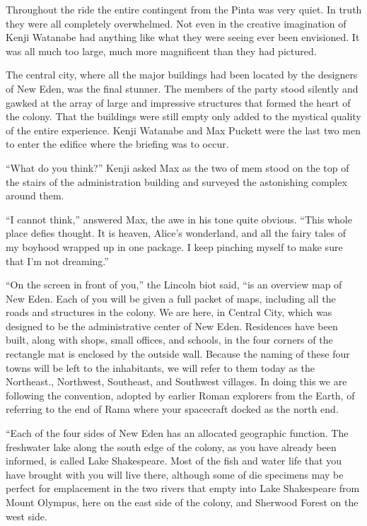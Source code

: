 \documentclass[]{article}
\begin{document}
{Throughout the ride the entire contingent from the Pinta was very quiet.  In truth they were all completely overwhelmed.  Not even in the creative imagination of Kenji Watanabe had anything like what they were seeing ever been envisioned.  It was all much too large, much more magnificent than they had pictured.

The central city, where all the major buildings had been located by the designers of New Eden, was the final stunner.  The members of the party stood silently and gawked at the array of large and impressive structures that formed the heart of the colony.  That the buildings were still empty only added to the mystical quality of the entire experience.  Kenji Watanabe and Max Puckett were the last two men to enter the edifice where the briefing was to occur.

“What do you think?” Kenji asked Max as the two of mem stood on the top of the stairs of the administration building and surveyed the astonishing complex around them.

“I cannot think,” answered Max, the awe in his tone quite obvious.  “This whole place defies thought.  It is heaven, Alice’s wonderland, and all the fairy tales of my boyhood wrapped up in one package.  I keep pinching myself to make sure that I’m not dreaming.”

“On the screen in front of you,” the Lincoln biot said, “is an overview map of New Eden.  Each of you will be given a full packet of maps, including all the roads and structures in the colony.  We are here, in Central City, which was designed to be the administrative center of New Eden.  Residences have been built, along with shops, small offices, and schools, in the four corners of the rectangle mat is enclosed by the outside wall.  Because the naming of these four towns will be left to the inhabitants, we will refer to them today as the Northeast., Northwest, Southeast, and Southwest villages.  In doing this we are following the convention, adopted by earlier Roman explorers from the Earth, of referring to the end of Rama where your spacecraft docked as the north end.

“Each of the four sides of New Eden has an allocated geographic function.  The freshwater lake along the south edge of the colony, as you have already been informed, is called Lake Shakespeare.  Most of the fish and water life that you have brought with you will live there, although some of die specimens may be perfect for emplacement in the two rivers that empty into Lake Shakespeare from Mount Olympus, here on the east side of the colony, and Sherwood Forest on the west side.

}
\end{document}
